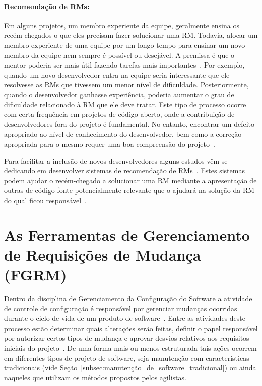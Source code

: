 \paragraph{Recomendação de RMs:}

Em alguns projetos, um membro experiente da equipe, geralmente ensina os
recém-chegados o que eles precisam fazer solucionar uma RM\@. Todavia, alocar um
membro experiente de uma equipe por um longo tempo para ensinar um novo membro
da equipe nem sempre é possível ou desejável. A premissa é que o mentor poderia
ser mais útil fazendo tarefas mais importantes~\cite{malheiros2012source}.  Por
exemplo, quando um novo desenvolvedor entra na equipe seria interessante que ele
resolvesse as RMs que tivessem um menor nível de dificuldade.  Posteriormente,
quando o desenvolvedor ganhasse experiência, poderia aumentar o grau de
dificuldade relacionado à RM que ele deve tratar. Este tipo de processo ocorre
com certa frequência em projetos de código aberto, onde a contribuição de
desenvolvedores fora do projeto é fundamental. No entanto, encontrar um defeito
apropriado ao nível de conhecimento do desenvolvedor, bem como a correção
apropriada para o mesmo requer uma boa compreensão do
projeto~\cite{Wang2011bug}.

Para facilitar a inclusão de novos desenvolvedores alguns estudos vêm se
dedicando em desenvolver sistemas de recomendação de
RMs~\cite{malheiros2012source, Wang2011bug}. Estes sistemas podem ajudar o
recém-chegado a solucionar uma RM mediante a apresentação de outras de código
fonte potencialmente relevante que o ajudará na solução da RM do qual ficou
responsável~\cite{malheiros2012source}.


\section{As Ferramentas de Gerenciamento de Requisições de Mudança (FGRM)}
\label{sec:ferramentas_de_gerenciamento_requisicoes_de_mudanca}

Dentro da disciplina de Gerenciamento da Configuração do Software a atividade de
controle de configuração é responsável por gerenciar mudanças ocorridas durante
o ciclo de vida de um produto de software~\cite{tripathy2014software}. Entre as
atividades deste processo estão determinar quais alterações serão feitas,
definir o papel responsável por autorizar certos tipos de mudança e aprovar
desvios relativos aos requisitos iniciais do projeto~\cite{4425813}. De uma
forma mais ou menos estruturada tais ações ocorrem em diferentes tipos de
projeto de software, seja manutenção com características tradicionais (vide
Seção~\ref{subsec:manutenção_de_software_tradicional}) ou ainda naqueles que
utilizam os métodos propostos pelos agilistas.


